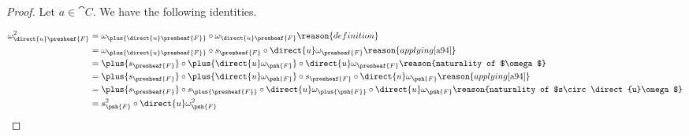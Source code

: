 
\begin{proof}
Let $a\in \cat{C}$.
We have the following identities.

\begin{align*}
	\omega^2_{\direct{u} \presheaf{F}} 
		&= \omega_{\plus{\direct{u} \presheaf{F}}} \circ \omega_{\direct{u} \presheaf{F}}
		\reason{definition} \\
		&= \omega_{\plus{\direct{u} \presheaf{F}}} \circ s_{\presheaf{F}} \circ \direct{u}\omega_{\presheaf{F}}
		\reason{applying \Cref{a94}} \\
		&= \plus{s_{\presheaf{F}}} \circ \plus{\direct{u}\omega_{\psh{F}}} \circ \direct{u}\omega_{\presheaf{F}}
		\reason{naturality of $\omega$} \\
		&= \plus{s_{\presheaf{F}}} \circ \plus{\direct{u}\omega_{\psh{F}}} \circ
		s_{\presheaf{F}} \circ \direct{u}\omega_{\psh{F}}
		\reason{applying \Cref{a94}} \\
		&= \plus{s_{\presheaf{F}}} \circ s_{\plus{\presheaf{F}}} \circ \direct{u}\omega_{\plus{\psh{F}}} \circ \direct{u}\omega_{\psh{F}}
		\reason{naturality of $s\circ \direct{u}\omega$}\\
		&= s^2_{\psh{F}} \circ \direct{u}\omega^2_{\psh{F}}\\
\end{align*}

\end{proof}
